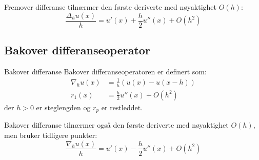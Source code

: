 \begin{remark*}{}{}
	Fremover differanse tilnærmer den første deriverte med nøyaktighet $O(h)$:
	\begin{equation}
		\frac{\Delta_h u(x)}{h} = u'(x) + \frac{h}{2}u''(x) + O(h^2)
	\end{equation}
\end{remark*}

\subsection{Bakover differanseoperator}
\begin{definition}{Bakover differanse}{}
	Bakover differanseoperatoren er definert som:
		\begin{align*}
			\nabla_h u(x) & = \frac{1}{h} \left( u(x) - u(x - h) \right) \tag{bakover} \\
			r_1(x) & = \frac{h}{2}u''(x) + O(h^2) \tag{rest}
		\end{align*}
		der \(h > 0\) er steglengden og \(r_p\) er restleddet.
	\end{definition}
\begin{remark*}{}{}
	Bakover differanse tilnærmer også den første deriverte med nøyaktighet $O(h)$, men bruker tidligere punkter:
	\begin{equation}
		\frac{\nabla_h u(x)}{h} = u'(x) - \frac{h}{2}u''(x) + O(h^2)
	\end{equation}
\end{remark*}

